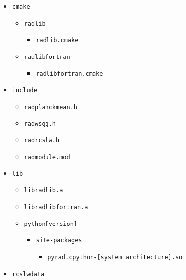 \documentclass[preprint,12pt]{elsarticle}
\begin{document}
    \begin{itemize}
        \item \texttt{cmake}
        \begin{itemize}
            \item \texttt{radlib}
            \begin{itemize}
                \item \texttt{radlib.cmake}
            \end{itemize}
            \item \texttt{radlib\textunderscore fortran}
            \begin{itemize}
                \item \texttt{radlib\textunderscore fortran.cmake}
            \end{itemize}
        \end{itemize}
        \item \texttt{include}
        \begin{itemize}
            \item \texttt{rad\textunderscore planck\textunderscore mean.h}
            \item \texttt{rad\textunderscore wsgg.h}
            \item \texttt{rad\textunderscore rcslw.h}
            \item \texttt{rad\textunderscore module.mod}
        \end{itemize}
        \item \texttt{lib}
        \begin{itemize}
            \item \texttt{libradlib.a}
            \item \texttt{libradlib\textunderscore fortran.a}
            \item \texttt{python[version]}
            \begin{itemize}
                \item \texttt{site-packages}
                \begin{itemize}
                    \item \texttt{pyrad.cpython-[system architecture].so}
                \end{itemize}
            \end{itemize}
        \end{itemize}
        \item \texttt{rcslw\textunderscore data}
    \end{itemize}
%
\end{document}

